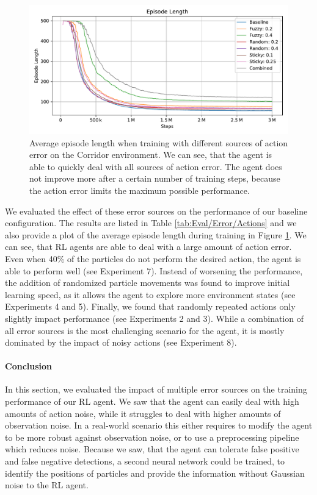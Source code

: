 \begin{figure}[htp]
    \begin{center}
        \includegraphics[clip, width=0.9\columnwidth]{figures/evaluation/error/action_error_ep_len.pdf}
    \end{center}
    \caption[Episode Length During Training with Action Error]{Average episode length when training with different sources of action error on the Corridor environment. We can see, that the agent is able to quickly deal with all sources of action error. The agent does not improve more after a certain number of training steps, because the action error limits the maximum possible performance.} \label{fig:Eval/Error/ActionsTrain}
\end{figure}

We evaluated the effect of these error sources on the performance of our baseline configuration. The results are listed in Table \ref{tab:Eval/Error/Actions} and we also provide a plot of the average episode length during training in Figure \ref{fig:Eval/Error/ActionsTrain}. We can see, that RL agents are able to deal with a large amount of action error. Even when 40\% of the particles do not perform the desired action, the agent is able to perform well (see Experiment 7). Instead of worsening the performance, the addition of randomized particle movements was found to improve initial learning speed, as it allows the agent to explore more environment states (see Experiments 4 and 5). Finally, we found that randomly repeated actions only slightly impact performance (see Experiments 2 and 3). While a combination of all error sources is the most challenging scenario for the agent, it is mostly dominated by the impact of noisy actions (see Experiment 8).  

\paragraph{Conclusion}
In this section, we evaluated the impact of multiple error sources on the training performance of our RL agent. We saw that the agent can easily deal with high amounts of action noise, while it struggles to deal with higher amounts of observation noise. In a real-world scenario this either requires to modify the agent to be more robust against observation noise, or to use a preprocessing pipeline which reduces noise. Because we saw, that the agent can tolerate false positive and false negative detections, a second neural network could be trained, to identify the positions of particles and provide the information without Gaussian noise to the RL agent.


